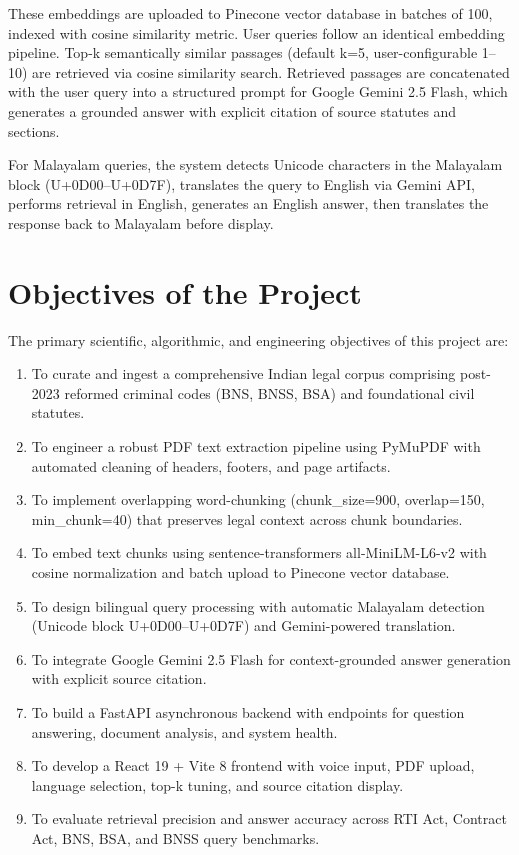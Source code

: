 \documentclass[12pt,a4paper]{report}
\begin{document}
These embeddings are uploaded to Pinecone vector database in batches of 100, indexed with cosine similarity metric. User queries follow an identical embedding pipeline. Top-k semantically similar passages (default k=5, user-configurable 1–10) are retrieved via cosine similarity search. Retrieved passages are concatenated with the user query into a structured prompt for Google Gemini 2.5 Flash, which generates a grounded answer with explicit citation of source statutes and sections.

For Malayalam queries, the system detects Unicode characters in the Malayalam block (U+0D00–U+0D7F), translates the query to English via Gemini API, performs retrieval in English, generates an English answer, then translates the response back to Malayalam before display.

\section{Objectives of the Project}
The primary scientific, algorithmic, and engineering objectives of this project are:
\begin{enumerate}
    \item To curate and ingest a comprehensive Indian legal corpus comprising post-2023 reformed criminal codes (BNS, BNSS, BSA) and foundational civil statutes.
    \item To engineer a robust PDF text extraction pipeline using PyMuPDF with automated cleaning of headers, footers, and page artifacts.
    \item To implement overlapping word-chunking (chunk\_size=900, overlap=150, min\_chunk=40) that preserves legal context across chunk boundaries.
    \item To embed text chunks using sentence-transformers all-MiniLM-L6-v2 with cosine normalization and batch upload to Pinecone vector database.
    \item To design bilingual query processing with automatic Malayalam detection (Unicode block U+0D00–U+0D7F) and Gemini-powered translation.
    \item To integrate Google Gemini 2.5 Flash for context-grounded answer generation with explicit source citation.
    \item To build a FastAPI asynchronous backend with endpoints for question answering, document analysis, and system health.
    \item To develop a React 19 + Vite 8 frontend with voice input, PDF upload, language selection, top-k tuning, and source citation display.
    \item To evaluate retrieval precision and answer accuracy across RTI Act, Contract Act, BNS, BSA, and BNSS query benchmarks.
\end{enumerate}
\end{document}
